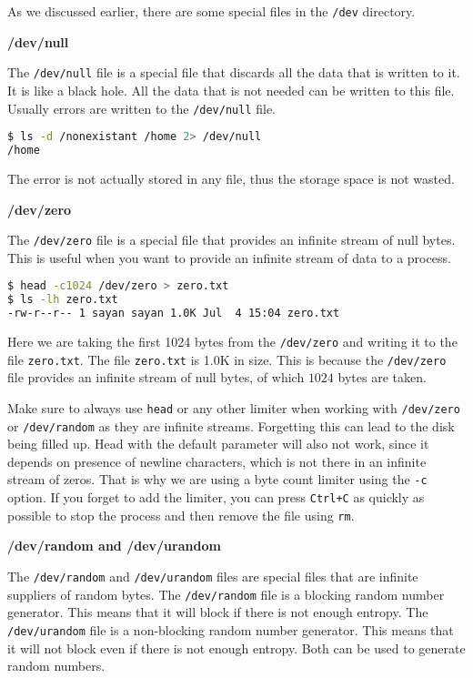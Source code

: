 As we discussed earlier, there are some special files in the \texttt{/dev}
directory.

\textbf{/dev/null}

The \texttt{/dev/null} file is a special file that discards all the data
that is written to it. It is like a black hole. All the data that is
not needed can be written to this file. Usually errors are written to
the \texttt{/dev/null} file.

\begin{lstlisting}[language=bash]
$ ls -d /nonexistant /home 2> /dev/null
/home
\end{lstlisting}

The error is not actually stored in any file, thus the storage
space is not wasted.

\textbf{/dev/zero}

The \texttt{/dev/zero} file is a special file that provides an infinite
stream of null bytes. This is useful when you want to provide an infinite
stream of data to a process.

\begin{lstlisting}[language=bash]
$ head -c1024 /dev/zero > zero.txt
$ ls -lh zero.txt
-rw-r--r-- 1 sayan sayan 1.0K Jul  4 15:04 zero.txt
\end{lstlisting}

Here we are taking the first 1024 bytes from the \texttt{/dev/zero}
and writing it to the file \texttt{zero.txt}. The file \texttt{zero.txt}
is 1.0K in size. This is because the \texttt{/dev/zero} file provides
an infinite stream of null bytes, of which $1024$ bytes are taken.

\begin{warn}
  Make sure to always use \texttt{head} or any other limiter when
  working with \texttt{/dev/zero} or \texttt{/dev/random} as they
  are infinite streams. Forgetting this can lead to the disk being
  filled up. Head with the default parameter will also not work,
  since it depends on presence of newline characters, which is
  not there in an infinite stream of zeros. That is why we are
  using a byte count limiter using the \texttt{-c} option.
  If you forget to add the limiter, you can press \texttt{Ctrl+C}
  as quickly as possible to stop the process and then remove the
  file using \texttt{rm}.
\end{warn}

\textbf{/dev/random and /dev/urandom}

The \texttt{/dev/random} and \texttt{/dev/urandom} files are special
files that are infinite suppliers of random bytes. The \texttt{/dev/random}
file is a blocking random number generator. This means that it will
block if there is not enough entropy. The \texttt{/dev/urandom} file
is a non-blocking random number generator. This means that it will
not block even if there is not enough entropy. Both can be used to
generate random numbers.

